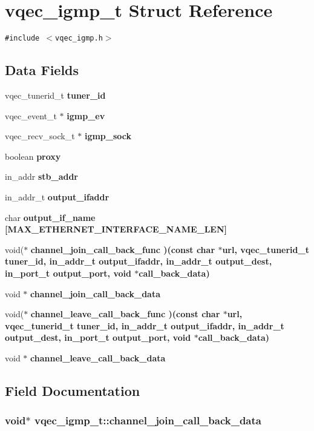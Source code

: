 \section{vqec\_\-igmp\_\-t Struct Reference}
\label{structvqec__igmp__t}
{\tt \#include $<$vqec\_\-igmp.h$>$}

\subsection*{Data Fields}
\begin{CompactItemize}
\item 
vqec\_\-tunerid\_\-t \bf{tuner\_\-id}
\item 
vqec\_\-event\_\-t $\ast$ \bf{igmp\_\-ev}
\item 
vqec\_\-recv\_\-sock\_\-t $\ast$ \bf{igmp\_\-sock}
\item 
boolean \bf{proxy}
\item 
in\_\-addr \bf{stb\_\-addr}
\item 
in\_\-addr\_\-t \bf{output\_\-ifaddr}
\item 
char \bf{output\_\-if\_\-name} [MAX\_\-ETHERNET\_\-INTERFACE\_\-NAME\_\-LEN]
\item 
void($\ast$ \bf{channel\_\-join\_\-call\_\-back\_\-func} )(const char $\ast$url, vqec\_\-tunerid\_\-t \bf{tuner\_\-id}, in\_\-addr\_\-t \bf{output\_\-ifaddr}, in\_\-addr\_\-t output\_\-dest, in\_\-port\_\-t output\_\-port, void $\ast$call\_\-back\_\-data)
\item 
void $\ast$ \bf{channel\_\-join\_\-call\_\-back\_\-data}
\item 
void($\ast$ \bf{channel\_\-leave\_\-call\_\-back\_\-func} )(const char $\ast$url, vqec\_\-tunerid\_\-t \bf{tuner\_\-id}, in\_\-addr\_\-t \bf{output\_\-ifaddr}, in\_\-addr\_\-t output\_\-dest, in\_\-port\_\-t output\_\-port, void $\ast$call\_\-back\_\-data)
\item 
void $\ast$ \bf{channel\_\-leave\_\-call\_\-back\_\-data}
\end{CompactItemize}


\subsection{Field Documentation}
\subsubsection{\setlength{\rightskip}{0pt plus 5cm}void$\ast$ \bf{vqec\_\-igmp\_\-t::channel\_\-join\_\-call\_\-back\_\-data}}\label{structvqec__igmp__t_2d6862f712ee02d96debbebfc99aba97}


